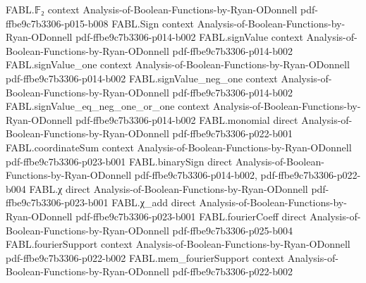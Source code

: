 \begin{theorem}
\label{FABL.close_to_linear_of_blrAcceptanceProbability_eq}
\leanok
{}
\proofstep
  {FABL.𝔽₂}
  {context}
  {Analysis-of-Boolean-Functions-by-Ryan-ODonnell}
  {pdf-ffbe9c7b3306-p015-b008}
\proofstep
  {FABL.Sign}
  {context}
  {Analysis-of-Boolean-Functions-by-Ryan-ODonnell}
  {pdf-ffbe9c7b3306-p014-b002}
\proofstep
  {FABL.signValue}
  {context}
  {Analysis-of-Boolean-Functions-by-Ryan-ODonnell}
  {pdf-ffbe9c7b3306-p014-b002}
\proofstep
  {FABL.signValue_one}
  {context}
  {Analysis-of-Boolean-Functions-by-Ryan-ODonnell}
  {pdf-ffbe9c7b3306-p014-b002}
\proofstep
  {FABL.signValue_neg_one}
  {context}
  {Analysis-of-Boolean-Functions-by-Ryan-ODonnell}
  {pdf-ffbe9c7b3306-p014-b002}
\proofstep
  {FABL.signValue_eq_neg_one_or_one}
  {context}
  {Analysis-of-Boolean-Functions-by-Ryan-ODonnell}
  {pdf-ffbe9c7b3306-p014-b002}
\proofstep
  {FABL.monomial}
  {direct}
  {Analysis-of-Boolean-Functions-by-Ryan-ODonnell}
  {pdf-ffbe9c7b3306-p022-b001}
\proofstep
  {FABL.coordinateSum}
  {context}
  {Analysis-of-Boolean-Functions-by-Ryan-ODonnell}
  {pdf-ffbe9c7b3306-p023-b001}
\proofstep
  {FABL.binarySign}
  {direct}
  {Analysis-of-Boolean-Functions-by-Ryan-ODonnell}
  {pdf-ffbe9c7b3306-p014-b002,
    pdf-ffbe9c7b3306-p022-b004}
\proofstep
  {FABL.χ}
  {direct}
  {Analysis-of-Boolean-Functions-by-Ryan-ODonnell}
  {pdf-ffbe9c7b3306-p023-b001}
\proofstep
  {FABL.χ_add}
  {direct}
  {Analysis-of-Boolean-Functions-by-Ryan-ODonnell}
  {pdf-ffbe9c7b3306-p023-b001}
\proofstep
  {FABL.fourierCoeff}
  {direct}
  {Analysis-of-Boolean-Functions-by-Ryan-ODonnell}
  {pdf-ffbe9c7b3306-p025-b004}
\proofstep
  {FABL.fourierSupport}
  {context}
  {Analysis-of-Boolean-Functions-by-Ryan-ODonnell}
  {pdf-ffbe9c7b3306-p022-b002}
\proofstep
  {FABL.mem_fourierSupport}
  {context}
  {Analysis-of-Boolean-Functions-by-Ryan-ODonnell}
  {pdf-ffbe9c7b3306-p022-b002}

\end{theorem}
